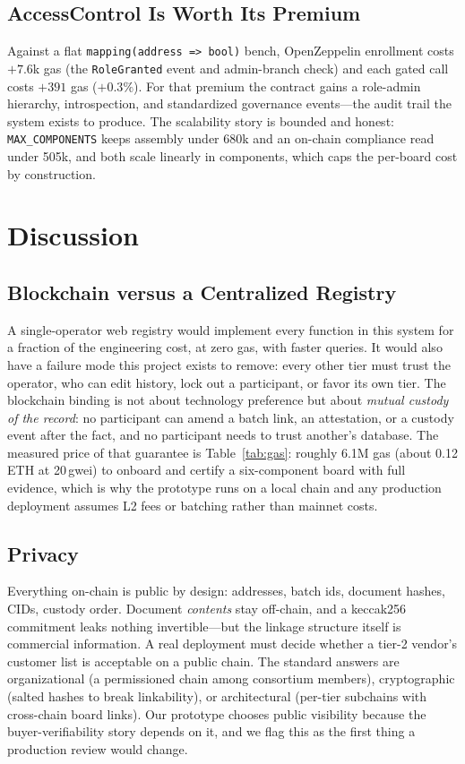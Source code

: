 \documentclass[conference]{IEEEtran}
\begin{document}
\subsection{AccessControl Is Worth Its Premium}
Against a flat \texttt{mapping(address => bool)} bench, OpenZeppelin enrollment costs $+7.6$k gas (the \texttt{RoleGranted} event and admin-branch check) and each gated call costs $+391$ gas ($+0.3\%$). For that premium the contract gains a role-admin hierarchy, introspection, and standardized governance events---the audit trail the system exists to produce. The scalability story is bounded and honest: \texttt{MAX\_COMPONENTS} keeps assembly under 680k and an on-chain compliance read under 505k, and both scale linearly in components, which caps the per-board cost by construction.

\section{Discussion}\label{sec:discussion}

\subsection{Blockchain versus a Centralized Registry}
A single-operator web registry would implement every function in this system for a fraction of the engineering cost, at zero gas, with faster queries. It would also have a failure mode this project exists to remove: every other tier must trust the operator, who can edit history, lock out a participant, or favor its own tier. The blockchain binding is not about technology preference but about \emph{mutual custody of the record}: no participant can amend a batch link, an attestation, or a custody event after the fact, and no participant needs to trust another's database. The measured price of that guarantee is Table~\ref{tab:gas}: roughly 6.1M gas (about 0.12 ETH at 20\,gwei) to onboard and certify a six-component board with full evidence, which is why the prototype runs on a local chain and any production deployment assumes L2 fees or batching rather than mainnet costs.

\subsection{Privacy}
Everything on-chain is public by design: addresses, batch ids, document hashes, CIDs, custody order. Document \emph{contents} stay off-chain, and a keccak256 commitment leaks nothing invertible---but the linkage structure itself is commercial information. A real deployment must decide whether a tier-2 vendor's customer list is acceptable on a public chain. The standard answers are organizational (a permissioned chain among consortium members), cryptographic (salted hashes to break linkability), or architectural (per-tier subchains with cross-chain board links). Our prototype chooses public visibility because the buyer-verifiability story depends on it, and we flag this as the first thing a production review would change.
\end{document}
